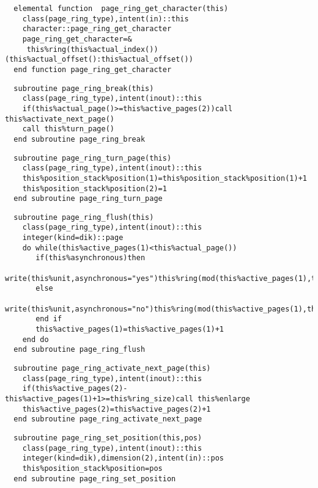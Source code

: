 \begin{Verbatim}
  elemental function  page_ring_get_character(this)
    class(page_ring_type),intent(in)::this
    character::page_ring_get_character
    page_ring_get_character=&
     this%ring(this%actual_index())(this%actual_offset():this%actual_offset())
  end function page_ring_get_character
\end{Verbatim}

\begin{Verbatim}
  subroutine page_ring_break(this)
    class(page_ring_type),intent(inout)::this
    if(this%actual_page()>=this%active_pages(2))call this%activate_next_page()
    call this%turn_page()
  end subroutine page_ring_break
\end{Verbatim}

\begin{Verbatim}
  subroutine page_ring_turn_page(this)
    class(page_ring_type),intent(inout)::this
    this%position_stack%position(1)=this%position_stack%position(1)+1
    this%position_stack%position(2)=1
  end subroutine page_ring_turn_page
\end{Verbatim}

\begin{Verbatim}
  subroutine page_ring_flush(this)
    class(page_ring_type),intent(inout)::this
    integer(kind=dik)::page
    do while(this%active_pages(1)<this%actual_page())
       if(this%asynchronous)then
          write(this%unit,asynchronous="yes")this%ring(mod(this%active_pages(1),this%ring_size))
       else
          write(this%unit,asynchronous="no")this%ring(mod(this%active_pages(1),this%ring_size))
       end if
       this%active_pages(1)=this%active_pages(1)+1
    end do
  end subroutine page_ring_flush
\end{Verbatim}

\begin{Verbatim}
  subroutine page_ring_activate_next_page(this)
    class(page_ring_type),intent(inout)::this
    if(this%active_pages(2)-this%active_pages(1)+1>=this%ring_size)call this%enlarge
    this%active_pages(2)=this%active_pages(2)+1
  end subroutine page_ring_activate_next_page
\end{Verbatim}

\begin{Verbatim}
  subroutine page_ring_set_position(this,pos)
    class(page_ring_type),intent(inout)::this
    integer(kind=dik),dimension(2),intent(in)::pos
    this%position_stack%position=pos
  end subroutine page_ring_set_position
\end{Verbatim}

